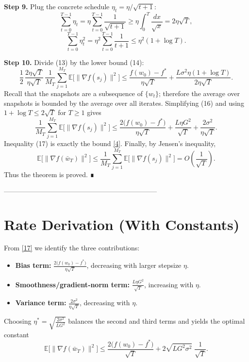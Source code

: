 \documentclass{article}
\newcommand{\E}{\mathbb{E}}
\begin{document}
\noindent\textbf{Step 9.} Plug the concrete schedule $\eta_t=\eta/\sqrt{t+1}$:
\[
\sum_{t=0}^{T-1}\eta_t = \eta\sum_{t=0}^{T-1}\frac{1}{\sqrt{t+1}}
\ge \eta\int_{0}^{T}\frac{dx}{\sqrt{x}} = 2\eta\sqrt{T}, \tag{14}
\]
\[
\sum_{t=0}^{T-1}\eta_t^{2}= \eta^{2}\sum_{t=0}^{T-1}\frac{1}{t+1}
\le \eta^{2}(1+\log T). \tag{15}
\]

\noindent\textbf{Step 10.} Divide (13) by the lower bound (14):
\[
\frac{1}{2}\,\frac{2\eta\sqrt{T}}{\eta\sqrt{T}}\,
\frac{1}{M_T}\sum_{j=1}^{M_T}\E\!\big[\|\nabla f(s_j)\|^{2}\big]
\le
\frac{f(w_0)-f^{*}}{\eta\sqrt{T}}
+\frac{L\sigma^{2}\eta(1+\log T)}{2\eta\sqrt{T}}. \tag{16}
\]
Recall that the snapshots are a subsequence of $\{w_t\}$; therefore the
average over snapshots is bounded by the average over all iterates.
Simplifying (16) and using $1+\log T\le 2\sqrt{T}$ for $T\ge 1$ gives
\[
\frac{1}{M_T}\sum_{j=1}^{M_T}\E\!\big[\|\nabla f(s_j)\|^{2}\big]
\le
\frac{2\big(f(w_0)-f^{*}\big)}{\eta\sqrt{T}}
+\frac{L\eta G^{2}}{\sqrt{T}}
+\frac{2\sigma^{2}}{\eta\sqrt{T}}. \tag{17}
\]
Inequality (17) is exactly the bound \eqref{4}.  Finally, by Jensen’s
inequality,
\[
\E\!\big[\|\nabla f(\bar w_T)\|^{2}\big]
\le \frac{1}{M_T}\sum_{j=1}^{M_T}\E\!\big[\|\nabla f(s_j)\|^{2}\big]
=O\!\left(\frac{1}{\sqrt{T}}\right). \tag{18}
\]
Thus the theorem is proved. ∎

--------------------------------------------------------------------

\section*{Rate Derivation (With Constants)}
From \eqref{17} we identify the three contributions:

\begin{itemize}
\item \textbf{Bias term:} $\displaystyle \frac{2\big(f(w_0)-f^{*}\big)}{\eta\sqrt{T}}$,
  decreasing with larger stepsize $\eta$.
\item \textbf{Smoothness/gradient‑norm term:} $\displaystyle \frac{L\eta G^{2}}{\sqrt{T}}$,
  increasing with $\eta$.
\item \textbf{Variance term:} $\displaystyle \frac{2\sigma^{2}}{\eta\sqrt{T}}$,
  decreasing with $\eta$.
\end{itemize}
Choosing $\eta^{*}= \sqrt{\frac{2\sigma^{2}}{L G^{2}}}$ balances the second
and third terms and yields the optimal constant
\[
\mathbb{E}\!\big[\|\nabla f(\bar w_T)\|^{2}\big]
\le
\frac{2\big(f(w_0)-f^{*}\big)}{\sqrt{T}}
+2\sqrt{L G^{2}\sigma^{2}}\;\frac{1}{\sqrt{T}}.
\]
\end{document}

